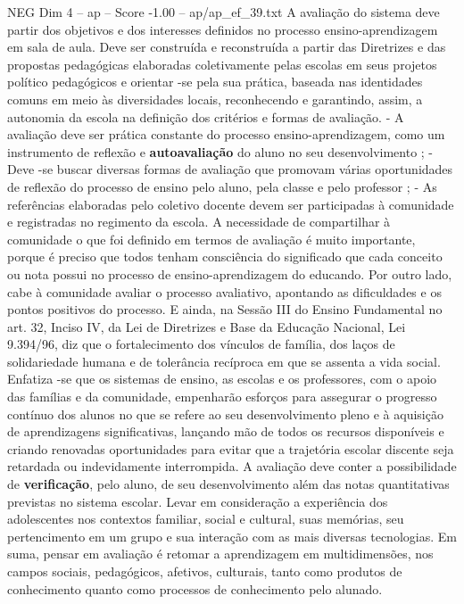 \begin{textsample}{NEG Dim 4 – ap – Score -1.00 – ap/ap\_ef\_39.txt}
A avaliação do sistema deve partir dos objetivos e dos interesses definidos no processo ensino-aprendizagem em sala de aula.
Deve ser construída e reconstruída a partir das Diretrizes e das propostas pedagógicas elaboradas coletivamente pelas escolas em seus projetos político pedagógicos e orientar -se pela sua prática, baseada nas identidades comuns em meio às diversidades locais, reconhecendo e garantindo, assim, a autonomia da escola na definição dos critérios e formas de avaliação. - A avaliação deve ser prática constante do processo ensino-aprendizagem, como um instrumento de reflexão e \textbf{autoavaliação} do aluno no seu desenvolvimento ; - Deve -se buscar diversas formas de avaliação que promovam várias oportunidades de reflexão do processo de ensino pelo aluno, pela classe e pelo professor ; - As referências elaboradas pelo coletivo docente devem ser participadas à comunidade e registradas no regimento da escola.
A necessidade de compartilhar à comunidade o que foi definido em termos de avaliação é muito importante, porque é preciso que todos tenham consciência do significado que cada conceito ou nota possui no processo de ensino-aprendizagem do educando.
Por outro lado, cabe à comunidade avaliar o processo avaliativo, apontando as dificuldades e os pontos positivos do processo.
E ainda, na Sessão III do Ensino Fundamental no art. 32, Inciso IV, da Lei de Diretrizes e Base da Educação Nacional, Lei 9.394/96, diz que o fortalecimento dos vínculos de família, dos laços de solidariedade humana e de tolerância recíproca em que se assenta a vida social.
Enfatiza -se que os sistemas de ensino, as escolas e os professores, com o apoio das famílias e da comunidade, empenharão esforços para assegurar o progresso contínuo dos alunos no que se refere ao seu desenvolvimento pleno e à aquisição de aprendizagens significativas, lançando mão de todos os recursos disponíveis e criando renovadas oportunidades para evitar que a trajetória escolar discente seja retardada ou indevidamente interrompida.
A avaliação deve conter a possibilidade de \textbf{verificação}, pelo aluno, de seu desenvolvimento além das notas quantitativas previstas no sistema escolar.
Levar em consideração a experiência dos adolescentes nos contextos familiar, social e cultural, suas memórias, seu pertencimento em um grupo e sua interação com as mais diversas tecnologias.
Em suma, pensar em avaliação é retomar a aprendizagem em multidimensões, nos campos sociais, pedagógicos, afetivos, culturais, tanto como produtos de conhecimento quanto como processos de conhecimento pelo alunado.

\end{textsample}
